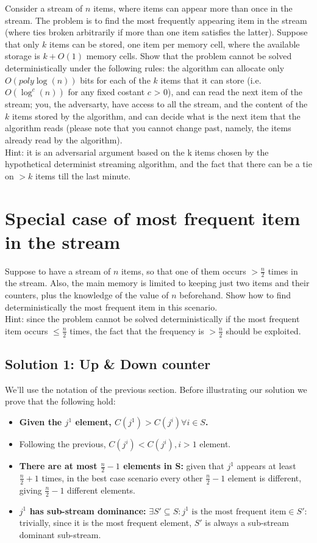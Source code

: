 \documentclass{article}
\begin{document}
Consider a stream of $n$ items, where items can appear more than once in the stream.
The problem is to find the most frequently appearing item in the stream (where ties
broken arbitrarily if more than one item satisfies the latter).
Suppose that only $k$ items can be stored, one item per memory cell, where the
available storage is $k + O(1)$ memory cells.
Show that the problem cannot be solved deterministically under the following rules:
the algorithm can allocate only $O(poly\log(n))$ bits for each of the $k$ items that
it can store (i.e. $O(\log^{c}(n))$ for any fixed costant $c$ > 0), and can read
the next item of the stream; you, the adversarty, have access to all the stream,
and the content of the $k$ items stored by the algorithm, and can decide what is
the next item that the algorithm reads (please note that you cannot change
past, namely, the items already read by the algorithm).
\\Hint: it is an adversarial argument based on the k items chosen by the
hypothetical determinist streaming algorithm, and the fact that there can be a
tie on $> k$ items till the last minute.


\newpage
\section{Special case of most frequent item in the stream}

Suppose to have a stream of $n$ items, so that one of them occurs $> \frac{n}{2}$
times in the stream.
Also, the main memory is limited to keeping just two items and their counters, plus
the knowledge of the value of $n$ beforehand.
Show how to find deterministically the most frequent item in this scenario.
\\ Hint: since the problem cannot be solved deterministically if the most
frequent item occurs $\leq \frac{n}{2}$ times, the fact that the frequency is
$> \frac{n}{2}$ should be exploited.

\subsection{Solution 1: Up \& Down counter}
We'll use the notation of the previous section.
Before illustrating our solution we prove that the following hold:
    \begin{itemize}
    \label{frequence_dominance}\item \textbf{Given the $j^{1}$ element, $C(j^{1}) > C(j^{i}) \forall i \in S$.}
    \item Following the previous, $C(j^{i}) < C(j^{i}),  i > 1$ element.
    \item \textbf{There are at most $\frac{n}{2} - 1$ elements in S:} given that $j^{1}$
    appears at least $\frac{n}{2} + 1$ times, in the best case scenario every
    other $\frac{n}{2} - 1$ element is different, giving $\frac{n}{2} - 1$
    different elements.
    \label{sub-stream_dominance}~\item \textbf{$j^{1}$ has sub-stream dominance:}
    $\exists S' \subseteq S: j^{1} \textrm{ is the most frequent item} \in S'$:
    trivially, since it is the most frequent element, $S'$ is always a sub-stream
    dominant sub-stream.
    \end{itemize}
\end{document}
